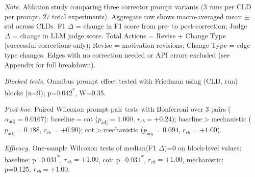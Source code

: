\begin{table}[H]
\centreing
\begin{minipage}{\linewidth}
\centreing
\caption{Corrector Prompt Ablation on Synthetic Corruptions: Performance Comparison}
\label{tab:rq1b_prompt_ablation_synthetic}
\begin{threeparttable}
\end{threeparttable}
\vspace{0.5em}
\footnotesize
\textit{Note.} Ablation study comparing three corrector prompt variants (3 runs per CLD per prompt, 27 total experiments). 
Aggregate row shows macro-averaged mean $\pm$ std across CLDs.
F1 $\Delta$ = change in F1 score from pre- to post-correction; Judge $\Delta$ = change in LLM judge score.
Total Actions = Revise + Change Type (successful corrections only); Revise = motivation revisions; Change Type = edge type changes.
Edges with no correction needed or API errors excluded (see Appendix for full breakdown).\par
\textit{Blocked tests.} Omnibus prompt effect tested with Friedman using (CLD, run) blocks (n=9); p=0.042\textsuperscript{*}, W=0.35.\par
\textit{Post-hoc.} Paired Wilcoxon prompt-pair tests with Bonferroni over 3 pairs ($\alpha_{\text{adj}}=0.0167$): baseline$=$cot ($p_{\text{adj}}=1.000$, $r_{rb}=+0.24$); baseline$>$mechanistic ($p_{\text{adj}}=0.188$, $r_{rb}=+0.90$); cot$>$mechanistic ($p_{\text{adj}}=0.094$, $r_{rb}=+1.00$).\par
\textit{Efficacy.} One-sample Wilcoxon tests of median(F1 $\Delta$)=0 on block-level values: baseline: p=0.031\textsuperscript{*}, $r_{rb}=+1.00$, cot: p=0.031\textsuperscript{*}, $r_{rb}=+1.00$, mechanistic: p=0.125, $r_{rb}=+1.00$.

\end{minipage}
\end{table}
